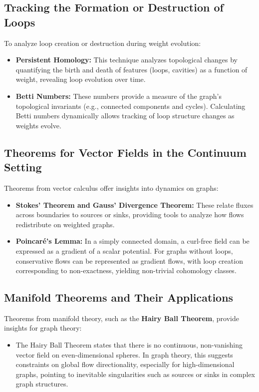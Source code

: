 \documentclass[10pt,a4paper,twocolumn]{article}
\begin{document}
	\subsection{Tracking the Formation or Destruction of Loops}
	To analyze loop creation or destruction during weight evolution:
	\begin{itemize}
		\item \textbf{Persistent Homology:} This technique analyzes topological changes by quantifying the birth and death of features (loops, cavities) as a function of weight, revealing loop evolution over time.
		\item \textbf{Betti Numbers:} These numbers provide a measure of the graph’s topological invariants (e.g., connected components and cycles). Calculating Betti numbers dynamically allows tracking of loop structure changes as weights evolve.
	\end{itemize}
	
	\subsection{Theorems for Vector Fields in the Continuum Setting}
	Theorems from vector calculus offer insights into dynamics on graphs:
	\begin{itemize}
		\item \textbf{Stokes’ Theorem and Gauss’ Divergence Theorem:} These relate fluxes across boundaries to sources or sinks, providing tools to analyze how flows redistribute on weighted graphs.
		\item \textbf{Poincaré’s Lemma:} In a simply connected domain, a curl-free field can be expressed as a gradient of a scalar potential. For graphs without loops, conservative flows can be represented as gradient flows, with loop creation corresponding to non-exactness, yielding non-trivial cohomology classes.
	\end{itemize}
	
	\subsection{Manifold Theorems and Their Applications}
	Theorems from manifold theory, such as the \textbf{Hairy Ball Theorem}, provide insights for graph theory:
	\begin{itemize}
		\item The Hairy Ball Theorem states that there is no continuous, non-vanishing vector field on even-dimensional spheres. In graph theory, this suggests constraints on global flow directionality, especially for high-dimensional graphs, pointing to inevitable singularities such as sources or sinks in complex graph structures.
	\end{itemize}
	
\end{document}
